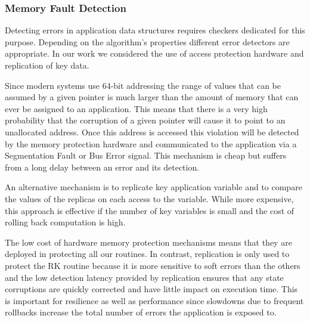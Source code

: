 \documentclass{sig-alternate}
\begin{document}
\subsubsection{Memory Fault Detection}
\label{sec:res_tech:err_det:mem}

Detecting errors in application data structures requires checkers dedicated for this purpose.
Depending on the algorithm's properties different error detectors are appropriate.
In our work we considered the use of access protection hardware and replication of key data.

Since modern systems use 64-bit addressing the range of values that can be assumed by a given pointer is much larger than the amount of memory that can ever be assigned to an application.
This means that there is a very high probability that the corruption of a given pointer will cause it to point to an unallocated address.
Once this address is accessed this violation will be detected by the memory protection hardware and communicated to the application via a Segmentation Fault or Bus Error signal.
This mechanism is cheap but suffers from a long delay between an error and its detection.

An alternative mechanism is to replicate key application variable and to compare the values of the replicas on each access to the variable.
While more expensive, this approach is effective if the number of key variables is small and the cost of rolling back computation is high.

The low cost of hardware memory protection mechanisms means that they are deployed in protecting all our routines.
In contrast, replication is only used to protect the RK routine because it is more sensitive to soft errors than the others and the low detection latency provided by replication ensures that any state corruptions are quickly corrected and have little impact on execution time.
This is important for resilience as well as performance since slowdowns due to frequent rollbacks increase the total number of errors the application is exposed to.
\end{document}
